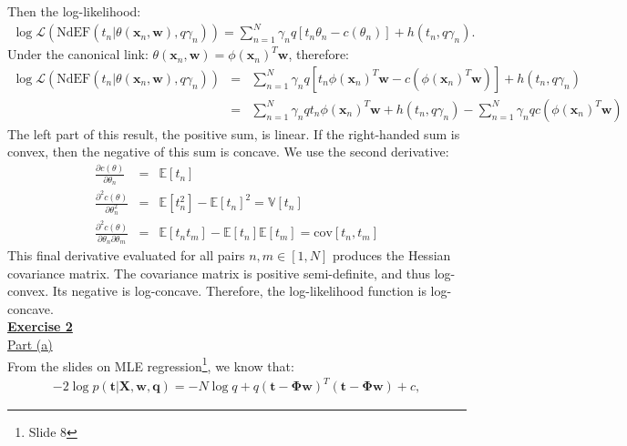 \documentclass[a4paper, 11pt]{article}
\begin{document}
\newline Then the log-likelihood:
\begin{eqnarray}
\log \mathcal{L} \left( \text{NdEF}( t_n | \theta (\mathbf{x}_n, \mathbf{w}), q \gamma_n ) \right) = \sum_{n=1}^{N} \gamma_n q [ t_n \theta_n - c(\theta_n) ] + h(t_n, q \gamma_n). \nonumber
\end{eqnarray}
Under the canonical link: $\theta(\mathbf{x}_n, \mathbf{w}) = \phi(\mathbf{x}_n)^T \mathbf{w}$, therefore:
\begin{eqnarray}
\log \mathcal{L} \left( \text{NdEF}( t_n | \theta (\mathbf{x}_n, \mathbf{w}), q \gamma_n ) \right) &=& \sum_{n=1}^{N} \gamma_n q [ t_n \phi(\mathbf{x}_n)^T \mathbf{w} - c(\phi(\mathbf{x}_n)^T \mathbf{w}) ] + h(t_n, q \gamma_n) \nonumber \\
&=& \sum_{n=1}^{N} \gamma_n q t_n \phi(\mathbf{x}_n)^T \mathbf{w} + h(t_n, q \gamma_n) - \sum_{n=1}^{N} \gamma_n q c(\phi(\mathbf{x}_n)^T \mathbf{w}) \nonumber
\end{eqnarray}
The left part of this result, the positive sum, is linear. If the right-handed sum is convex, then the negative of this sum is concave. We use the second derivative:
\begin{eqnarray}
\frac{\partial c(\theta)}{\partial \theta_n} &=& \mathbb{E}[t_n] \nonumber \\
\frac{\partial^2 c(\theta)}{\partial \theta_{n}^{2}} &=& \mathbb{E}[t_n^2] - \mathbb{E}[t_n]^2 = \mathbb{V}[t_n] \nonumber \\
\frac{\partial^2 c(\theta)}{\partial \theta_n \partial \theta_m} &=&\mathbb{E}[t_n t_m] - \mathbb{E}[t_n] \mathbb{E}[t_m] = \text{cov}[t_n, t_m] \nonumber
\end{eqnarray}
This final derivative evaluated for all pairs $n, m \in [1, N]$ produces the Hessian covariance matrix. The covariance matrix is positive semi-definite, and thus log-convex. Its negative is log-concave. Therefore, the log-likelihood function is log-concave.\\
\newpage
\textbf{\underline{Exercise 2}}\\
\newline \underline{Part (a)}\\
\newline From the slides on MLE regression\footnote{Slide 8}, we know that:
\begin{eqnarray}
-2 \log p(\mathbf{t} | \mathbf{X}, \mathbf{w}, \mathbf{q}) = -N \log q + q (\mathbf{t} - \mathbf{\Phi w})^T (\mathbf{t} - \mathbf{\Phi w}) + c, \nonumber
\end{eqnarray}
\end{document}
